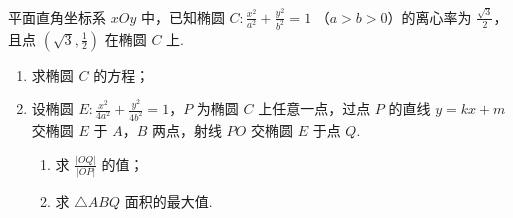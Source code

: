 \begin{problem}
平面直角坐标系 \(xOy\) 中，已知椭圆 \(C: \frac{x^2}{a^2} + \frac{y^2}{b^2} = 1 \) （\(a > b > 0\)）的离心率为 \(\frac{\sqrt{3}}{2}\)，且点 \(\left(\sqrt{3}, \frac{1}{2}\right)\) 在椭圆 \(C\) 上.

\begin{enumerate}
\item 求椭圆 \(C\) 的方程；
\item 设椭圆 \(E: \frac{x^2}{4a^2} + \frac{y^2}{4b^2} = 1\)，\(P\) 为椭圆 \(C\) 上任意一点，过点 \(P\) 的直线 \(y = kx + m\) 交椭圆 \(E\) 于 \(A\)，\(B\) 两点，射线 \(PO\) 交椭圆 \(E\) 于点 \(Q\).
\begin{enumerate}
\item 求 \(\frac{|OQ|}{|OP|}\) 的值；
\item 求 \(\triangle ABQ\) 面积的最大值.
\end{enumerate}
\end{enumerate}
\end{problem}

